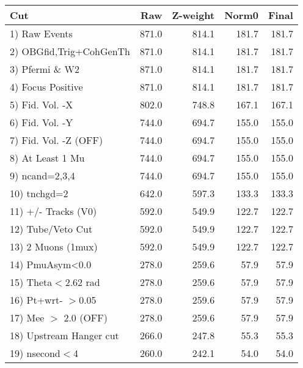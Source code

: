  \begin{table}[h!]\centering
 \begin{tabular}{||l||r|r|r|r||}
 \hline
 \hline
 Cut & Raw & Z-weight & Norm0 & Final \\
 \hline
  1) Raw Events           &       871.0 &       814.1 &       181.7 &       181.7 \\
  2) OBGfid,Trig+CohGenTh &       871.0 &       814.1 &       181.7 &       181.7 \\
  3) Pfermi \& W2         &       871.0 &       814.1 &       181.7 &       181.7 \\
  4) Focus Positive       &       871.0 &       814.1 &       181.7 &       181.7 \\
  5) Fid. Vol. -X         &       802.0 &       748.8 &       167.1 &       167.1 \\
  6) Fid. Vol. -Y         &       744.0 &       694.7 &       155.0 &       155.0 \\
  7) Fid. Vol. -Z (OFF)   &       744.0 &       694.7 &       155.0 &       155.0 \\
  8) At Least 1 Mu        &       744.0 &       694.7 &       155.0 &       155.0 \\
  9) ncand=2,3,4          &       744.0 &       694.7 &       155.0 &       155.0 \\
 10) tnchgd=2             &       642.0 &       597.3 &       133.3 &       133.3 \\
 11) +/- Tracks (V0)      &       592.0 &       549.9 &       122.7 &       122.7 \\
 12) Tube/Veto Cut        &       592.0 &       549.9 &       122.7 &       122.7 \\
 13) 2 Muons (1mux)       &       592.0 &       549.9 &       122.7 &       122.7 \\
 14) PmuAsym<0.0          &       278.0 &       259.6 &        57.9 &        57.9 \\
 15) Theta$<$2.62 rad     &       278.0 &       259.6 &        57.9 &        57.9 \\
 16) Pt+wrt- $>$0.05      &       278.0 &       259.6 &        57.9 &        57.9 \\
 17) Mee $>$ 2.0  (OFF)   &       278.0 &       259.6 &        57.9 &        57.9 \\
 18) Upstream Hanger cut  &       266.0 &       247.8 &        55.3 &        55.3 \\
 19) nsecond$<$4          &       260.0 &       242.1 &        54.0 &        54.0 \\

\end{tabular}
\end{table}
